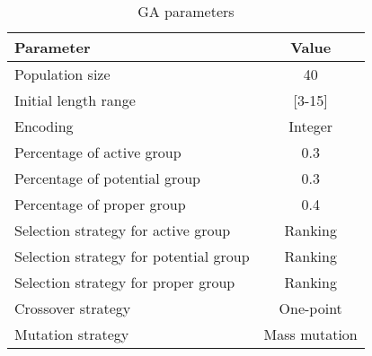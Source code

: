 \begin{table}[!ht]
\centering
\caption{GA parameters}
\begin{adjustbox}{width=0.45\textwidth}
\label{tab:ga}
\begin{tabular}{lc}
\toprule
Parameter								&  Value  \\
\midrule
Population size							& 40        \\
Initial length range					& [3-15]    \\
Encoding								& Integer   \\
Percentage of active group				& 0.3   \\
Percentage of potential group			& 0.3   \\
Percentage of proper group				& 0.4   \\
Selection strategy for  active group	& Ranking   \\
Selection strategy for potential group	& Ranking   \\
Selection strategy for proper group	& Ranking   \\
Crossover strategy			    		& One-point \\
Mutation strategy			    		& Mass mutation \\
\bottomrule
\end{tabular}
\end{adjustbox}
\end{table}
